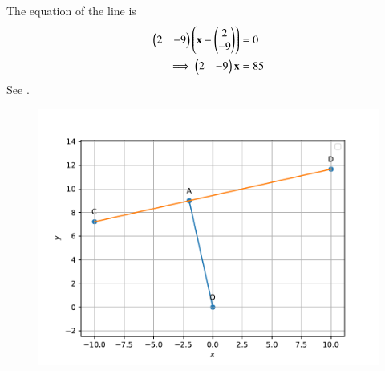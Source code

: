 
The equation of the line is 
\begin{align}
	\begin{pmatrix}2 & -9\end{pmatrix}\left(\mathbf{x} - \begin{pmatrix}2 \\ -9\end{pmatrix}\right)&= 0
	\\
	\implies 
	\begin{pmatrix}2 & -9\end{pmatrix}\mathbf{x} &= 85
\end{align}
See 
		.
	\begin{figure}[!ht]
		\centering
 \includegraphics[width=\columnwidth]{chapters/11/10/2/15/figs/line.pdf}
		\caption{}
		\label{fig:11/10/2/15}
  	\end{figure}
